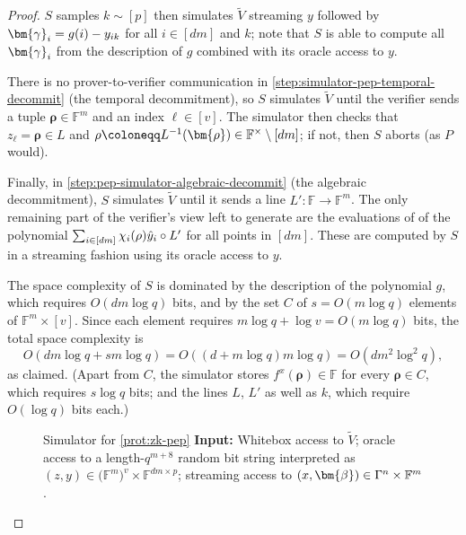 \documentclass[a4paper,UKenglish,cleveref, autoref, thm-restate]{lipics-v2021}
\theoremstyle{definition}
\newcommand{\field}{\mathbb{F}}
\newcommand{\vcommitlength}{v}
\newcommand{\vcommitstring}{z}
\newcommand{\pcommitlength}{p}
\newcommand{\pcommitstring}{y}
\newcommand{\dimension}{m}
\newcommand{\degree}{d}
\newcommand{\fieldsize}{q}
\newcommand{\evaluationpoint}{\bm{\fe2}}
\newcommand{\fingerprinttuple}{\bm{\rho}}
\renewcommand{\line}{L}
\newcommand{\alphabet}{\Gamma}
\def\fe#1{
    \ifnum#1=1
        \alpha
    \else
    \ifnum#1=2
        \beta
    \else
    \ifnum#1=3
        \gamma
    \fi\fi\fi
}
\def\rfe#1{
    \ifnum#1=1
        \rho
    \else
    \ifnum#1=2
        \sigma
    \else
    \fi\fi
}
\begin{document}
\begin{proof}
    $S$ samples $k \sim [\pcommitlength]$ then simulates $\widetilde V$ streaming $\pcommitstring$ followed by $\bm{\fe3}_i = g(i) - \pcommitstring_{ik}$ for all $i \in [\degree \dimension]$ and $k$; note that $S$ is able to compute all $\bm{\fe3}_i$ from the description of $g$ combined with its oracle access to $\pcommitstring$.

    There is no prover-to-verifier communication in \cref{step:simulator-pep-temporal-decommit} (the temporal decommitment), so $S$ simulates $\widetilde V$ until the verifier sends a tuple $\fingerprinttuple \in \field^\dimension$ and an index $\ell \in [\vcommitlength]$. The simulator then checks that $\vcommitstring_\ell = \fingerprinttuple \in \line$ and $\rfe1 \coloneqq \line^{-1}(\fingerprinttuple) \in \field^\times \setminus [\degree\dimension]$; if not, then $S$ aborts (as $P$ would).
    
    Finally, in \cref{step:pep-simulator-algebraic-decommit} (the algebraic decommitment), $S$ simulates $\widetilde V$ until it sends a line $\line': \field \to \field^\dimension$. The only remaining part of the verifier's view left to generate are the evaluations of  of the polynomial $\sum_{i \in [\degree\dimension]} \chi_i(\rfe1) \hat \pcommitstring_i \circ \line'$ for all points in $[\degree\dimension]$. These are computed by $S$ in a streaming fashion using its oracle access to $\pcommitstring$.

    The space complexity of $S$ is dominated by the description of the polynomial $g$, which requires $O(\degree\dimension \log \fieldsize)$ bits, and by the set $C$ of $s = O(\dimension \log \fieldsize)$ elements of $\field^\dimension \times [\vcommitlength]$. Since each element requires $\dimension \log \fieldsize + \log \vcommitlength = O(\dimension \log \fieldsize)$ bits, the total space complexity is
    \begin{equation*}
        O(\degree\dimension \log \fieldsize + s\dimension \log \fieldsize) = O\left((\degree + \dimension \log \fieldsize) \dimension \log \fieldsize\right) = O(\degree \dimension^2 \log^2 \fieldsize),
    \end{equation*}
    as claimed. (Apart from $C$, the simulator stores $f^x(\fingerprinttuple) \in \field$ for every $\fingerprinttuple \in C$, which requires $s \log \fieldsize$ bits; and the lines $\line$, $\line'$ as well as $k$, which require $O(\log \fieldsize)$ bits each.) 
    
    \iflipics
    \begin{figure}
    \else
    \begin{algorithm}[label={alg:pep-simulator}]{Simulator for \cref{prot:zk-pep}}
    \fi
	    \textbf{Input:} Whitebox access to $\widetilde V$; oracle access to a length-$\fieldsize^{\dimension + 8}$ random bit string interpreted as $(\vcommitstring, \pcommitstring) \in \big(\field^\dimension\big)^\vcommitlength \times \field^{\degree\dimension \times \pcommitlength}$; streaming access to $(x, \evaluationpoint) \in \alphabet^n \times \field^\dimension$.\\
	    

\end{algorithm}
\end{figure}
\end{proof}
\end{document}
